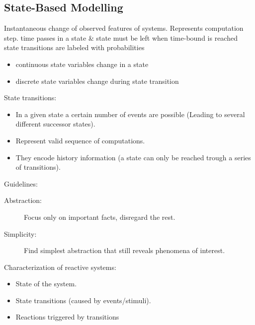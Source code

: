 \documentclass[a4paper, 10pt]{article}
\begin{document}
\subsection{State-Based Modelling}
\begin{mdframed}[roundcorner=5pt,
subtitlebelowline=false,subtitleaboveline=false,
subtitlebackgroundcolor=blue!50,
frametitlerule=true,
frametitlebackgroundcolor=blue!50,
frametitle={State Transition in Discrete Systems}
]
Instantaneous change of observed features of systems. Represents computation step.
time passes in a state \& state must be left when time-bound is reached
state transitions are labeled with probabilities
\begin{itemize}
    \item continuous state variables change in a state
    \item discrete state variables change during state transition
\end{itemize}
\end{mdframed}

State transitions:
\begin{itemize}
    \item In a given state a certain number of events are possible (Leading to several different successor states).
    \item Represent valid sequence of computations.
    \item They encode history information (a state can only be reached trough a series of transitions).
\end{itemize}

Guidelines:
\begin{description}
    \item[Abstraction:] Focus only on important facts, disregard the rest.
    \item[Simplicity:] Find simplest abstraction that still reveals phenomena of interest.
\end{description}

Characterization of reactive systems:
\begin{itemize}
    \item State of the system.
    \item State transitions (caused by events/stimuli).
    \item Reactions triggered by transitions
\end{itemize}
\end{document}
